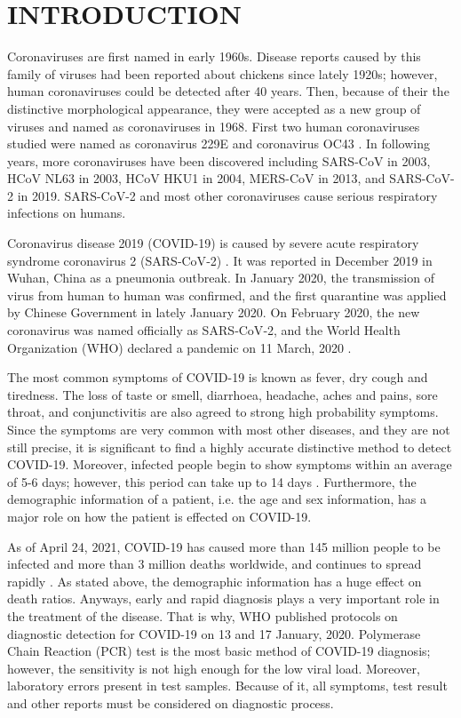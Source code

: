 \chapter{INTRODUCTION}\label{CH1}
Coronaviruses are first named in early 1960s. Disease reports caused by this family of viruses had been reported about chickens since lately 1920s; however, human coronaviruses could be detected after 40 years. Then, because of their the distinctive morphological appearance, they were accepted as a new group of viruses and named as coronaviruses in 1968. First two human coronaviruses studied were named as coronavirus 229E and coronavirus OC43 \cite{history_coronavirus}. In following years, more coronaviruses have been discovered including SARS-CoV in 2003, HCoV NL63 in 2003, HCoV HKU1 in 2004, MERS-CoV in 2013, and SARS-CoV-2 in 2019. SARS-CoV-2 and most other coronaviruses cause serious respiratory infections on humans.

Coronavirus disease 2019 (COVID-19) is caused by severe acute respiratory syndrome coronavirus 2 (SARS‑CoV‑2) \cite{coronavirus_species}. It was reported in December 2019 in Wuhan, China as a pneumonia outbreak. In January 2020, the transmission of virus from human to human was confirmed, and the first quarantine was applied by Chinese Government in lately January 2020. On February 2020, the new coronavirus was named officially as SARS‑CoV‑2, and the World Health Organization (WHO) declared a pandemic on 11 March, 2020 \cite{who_pandemic_declaration}.

The most common symptoms of COVID-19 is known as fever, dry cough and tiredness. The loss of taste or smell, diarrhoea, headache, aches and pains, sore throat, and conjunctivitis are also agreed to strong high probability symptoms. Since the symptoms are very common with most other diseases, and they are not still precise, it is significant to find a highly accurate distinctive method to detect COVID-19. Moreover, infected people begin to show symptoms within an average of 5-6 days; however, this period can take up to 14 days \cite{who_qa}. Furthermore, the demographic information of a patient, i.e. the age and sex information, has a major role on how the patient is effected on COVID-19.

As of April 24, 2021, COVID-19 has caused more than 145 million people to be infected and more than 3 million deaths worldwide, and continues to spread rapidly \cite{covid19_news}. As stated above, the demographic information has a huge effect on death ratios. Anyways, early and rapid diagnosis plays a very important role in the treatment of the disease. That is why, WHO published protocols on diagnostic detection for COVID-19 on 13 and 17 January, 2020. Polymerase Chain Reaction (PCR) test \cite{pcr_cleveland_clinic} is the most basic method of COVID-19 diagnosis; however, the sensitivity is not high enough for the low viral load. Moreover, laboratory errors present in test samples. Because of it, all symptoms, test result and other reports must be considered on diagnostic process.

